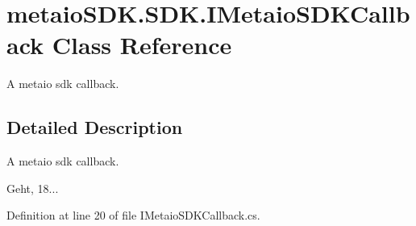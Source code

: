 \section{metaio\-S\-D\-K.\-S\-D\-K.\-I\-Metaio\-S\-D\-K\-Callback Class Reference}
\label{classmetaio_s_d_k_1_1_s_d_k_1_1_i_metaio_s_d_k_callback}


A metaio sdk callback.  




\subsection{Detailed Description}
A metaio sdk callback. 

Geht, 18... 

Definition at line 20 of file I\-Metaio\-S\-D\-K\-Callback.\-cs.

